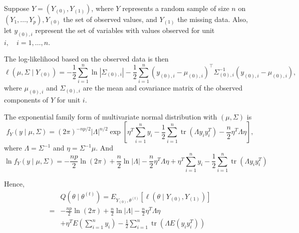 \begin{example}
	Suppose \(Y=\left(Y_{(0)}, Y_{(1)}\right)\), where \(Y\) represents a random sample of size \(n\) on \(\left(Y_{1}, \ldots, Y_{p}\right), Y_{(0)}\) the set of observed values, and \(Y_{(1)}\) the missing data. Also, let \(y_{(0), i}\) represent the set of variables with values observed for unit \(i, \quad i=1, \ldots, n\).

	The log-likelihood based on the observed data is then
	\begin{equation}
		\ell\left(\mu, \Sigma \mid Y_{(0)}\right)=-\frac{1}{2} \sum_{i=1}^{n} \ln \left|\Sigma_{(0), i}\right|-\frac{1}{2} \sum_{i=1}^{n}\left(y_{(0), i}-\mu_{(0), i}\right)^{\top} \Sigma_{(0), i}^{-1}\left(y_{(0), i}-\mu_{(0), i}\right),
	\end{equation}
	where \(\mu_{(0), i}\) and \(\Sigma_{(0), i}\) are the mean and covariance matrix of the observed components of \(Y\) for unit \(i\).

	The exponential family form of multivariate normal distribution with \(\left(\mu,\Sigma\right)\) is
	\begin{equation}
		f_{Y}(y\mid\mu,\Sigma)=(2\pi)^{-np/2}|\Lambda|^{n/2}\exp\left[\eta^{T}\sum_{i=1}^{n}y_{i}-\frac{1}{2}\sum_{i=1}^{n}\operatorname{tr}\left(\Lambda y_{i}y_{i}^{T}\right)-\frac{n}{2}\eta^{T}\Lambda\eta\right],
	\end{equation}
	where \(\Lambda=\Sigma^{-1}\) and \(\eta=\Sigma^{-1}\mu\). And
	\begin{equation}
		\ln f_{Y}(y\mid\mu,\Sigma)=-\frac{np}{2}\ln(2\pi)+\frac{n}{2}\ln|\Lambda|-\frac{n}{2}\eta^{T}\Lambda\eta+\eta^{T}\sum_{i=1}^{n}y_{i}-\frac{1}{2}\sum_{i=1}^{n}\operatorname{tr}\left(\Lambda y_{i}y_{i}^{T}\right)
	\end{equation}

	Hence,
	\begin{equation}
		\begin{aligned}
			  & Q\left(\theta\mid\theta^{(t)}\right)=E_{Y_{(0)},\theta^{(t)}}\left[\ell\left(\theta\mid Y_{(0)},Y_{(1)}\right)\right]                  \\
			= & -\frac{np}{2}\ln(2\pi)+\frac{n}{2}\ln|\Lambda|-\frac{n}{2}\eta^{T}\Lambda\eta                                                          \\
			  & +\eta^{T}E\left(\sum_{i=1}^{n}y_{i}\right)-\frac{1}{2}\sum_{i=1}^{n}\operatorname{tr}\left(\Lambda E\left(y_{i}y_{i}^{T}\right)\right)
		\end{aligned}
	\end{equation}


\end{example}
